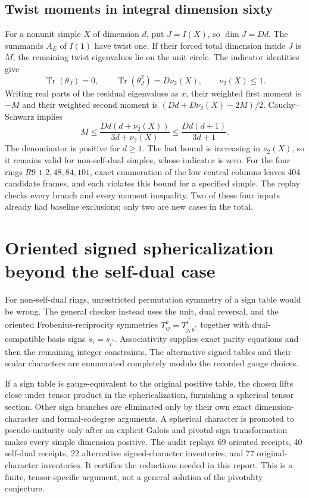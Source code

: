 \documentclass[11pt]{article}
\theoremstyle{remark}\newtheorem{remark}[proposition]{Remark}
\begin{document}
\subsection{Twist moments in integral dimension sixty}
For a nonunit simple $X$ of dimension $d$, put $J=I(X)$, so $\dim J=Dd$.
The summands $A_E$ of $I(1)$ have twist one. If their forced total dimension
inside $J$ is $M$, the remaining twist eigenvalues lie on the unit circle.
The indicator identities \cite{NgSchauenburg} give
\[
 \operatorname{Tr}(\theta_J)=0,\qquad
 \operatorname{Tr}(\theta_J^2)=D\nu_2(X),\qquad \nu_2(X)\leq1.
\]
Writing real parts of the residual eigenvalues as $x$, their weighted first
moment is $-M$ and their weighted second moment is
$(Dd+D\nu_2(X)-2M)/2$. Cauchy--Schwarz implies
\[
 M\leq\frac{Dd(d+\nu_2(X))}{3d+\nu_2(X)}
 \leq\frac{Dd(d+1)}{3d+1}.
\]
The denominator is positive for $d\geq1$. The last bound is increasing in
$\nu_2(X)$, so it remains valid for non-self-dual simples, whose indicator
is zero. For the four rings $R9\_1\_2,48,84,101$, exact enumeration of
the low central columns leaves 404 candidate frames, and each violates
this bound for a specified simple. The replay checks every branch and every
moment inequality. Two of these four inputs already had baseline exclusions;
only two are new cases in the total.


\section{Oriented signed sphericalization beyond the self-dual case}
For non-self-dual rings, unrestricted permutation symmetry of a sign table
would be wrong. The general checker instead uses the unit, dual reversal,
and the oriented Frobenius-reciprocity symmetries
$T_{ij}^{k}=T_{j,k^*}^{i^*}$ together with dual-compatible basis signs
$s_i=s_{i^*}$. Associativity supplies exact parity equations and then the
remaining integer constraints. The alternative signed tables and their scalar
characters are enumerated completely modulo the recorded gauge choices.

If a sign table is gauge-equivalent to the original positive table, the
chosen lifts close under tensor product in the sphericalization, furnishing
a spherical tensor section. Other sign branches are eliminated only by
their own exact dimension-character and formal-codegree arguments. A
spherical character is promoted to pseudo-unitarity only after an explicit
Galois and pivotal-sign transformation makes every simple dimension positive.
The audit replays 69 oriented receipts, 40 self-dual receipts, 22 alternative
signed-character inventories, and 77 original-character inventories. It
certifies the reductions needed in this report. This is a finite, tensor-specific
argument, not a general solution of the pivotality conjecture.
\end{document}
